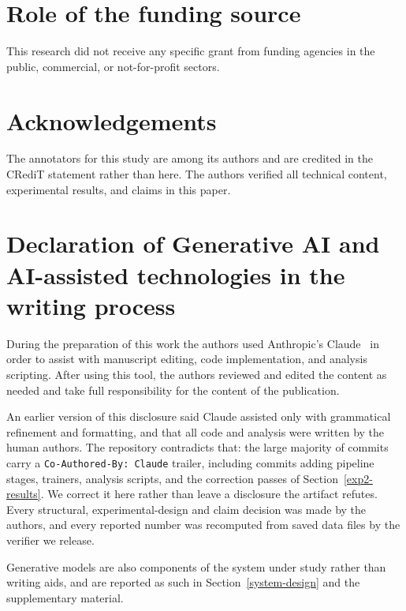 \documentclass[preprint,12pt]{elsarticle}
\begin{document}
\section*{Role of the funding source}
This research did not receive any specific grant from funding agencies in the public,
commercial, or not-for-profit sectors.

\section*{Acknowledgements}
The annotators for this study are among its authors and are credited in the CRediT statement
rather than here. The authors verified all technical content, experimental results, and claims in
this paper.

\section*{Declaration of Generative AI and AI-assisted technologies in the writing process}
During the preparation of this work the authors used Anthropic's Claude~\cite{anthropic2025claude} in order to assist with
manuscript editing, code implementation, and analysis scripting. After using this tool, the authors
reviewed and edited the content as needed and take full responsibility for the content of the
publication.

An earlier version of this disclosure said Claude assisted only with grammatical refinement and
formatting, and that all code and analysis were written by the human authors. The repository
contradicts that: the large majority of commits carry a \texttt{Co-Authored-By: Claude}
trailer, including commits adding pipeline stages, trainers,
analysis scripts, and the correction passes of Section~\ref{exp2-results}. We correct it here
rather than leave a disclosure the artifact refutes. Every structural, experimental-design and
claim decision was made by the authors, and every reported number was recomputed from saved data
files by the verifier we release.

Generative models are also components of the system under study rather than writing aids, and are
reported as such in Section~\ref{system-design} and the supplementary material.




\appendix
\end{document}
